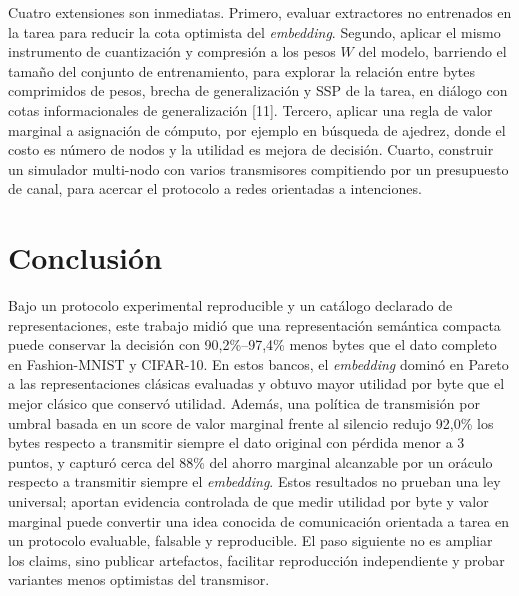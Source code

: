 Cuatro extensiones son inmediatas. Primero, evaluar extractores no entrenados en la tarea para reducir la cota optimista del \emph{embedding}. Segundo, aplicar el mismo instrumento de cuantizaci\'on y compresi\'on a los pesos $W$ del modelo, barriendo el tama\~no del conjunto de entrenamiento, para explorar la relaci\'on entre bytes comprimidos de pesos, brecha de generalizaci\'on y SSP de la tarea, en di\'alogo con cotas informacionales de generalizaci\'on [11]. Tercero, aplicar una regla de valor marginal a asignaci\'on de c\'omputo, por ejemplo en b\'usqueda de ajedrez, donde el costo es n\'umero de nodos y la utilidad es mejora de decisi\'on. Cuarto, construir un simulador multi-nodo con varios transmisores compitiendo por un presupuesto de canal, para acercar el protocolo a redes orientadas a intenciones.

\section{Conclusi\'on}

Bajo un protocolo experimental reproducible y un cat\'alogo declarado de representaciones, este trabajo midi\'o que una representaci\'on sem\'antica compacta puede conservar la decisi\'on con 90{,}2\%--97{,}4\% menos bytes que el dato completo en Fashion-MNIST y CIFAR-10. En estos bancos, el \emph{embedding} domin\'o en Pareto a las representaciones cl\'asicas evaluadas y obtuvo mayor utilidad por byte que el mejor cl\'asico que conserv\'o utilidad. Adem\'as, una pol\'itica de transmisi\'on por umbral basada en un score de valor marginal frente al silencio redujo 92{,}0\% los bytes respecto a transmitir siempre el dato original con p\'erdida menor a 3 puntos, y captur\'o cerca del 88\% del ahorro marginal alcanzable por un or\'aculo respecto a transmitir siempre el \emph{embedding}. Estos resultados no prueban una ley universal; aportan evidencia controlada de que medir utilidad por byte y valor marginal puede convertir una idea conocida de comunicaci\'on orientada a tarea en un protocolo evaluable, falsable y reproducible. El paso siguiente no es ampliar los claims, sino publicar artefactos, facilitar reproducci\'on independiente y probar variantes menos optimistas del transmisor.

